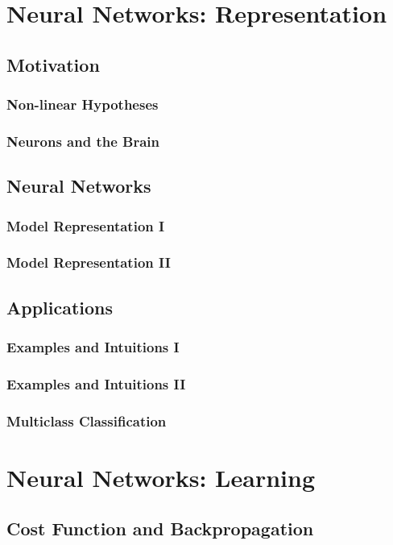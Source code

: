 \documentclass{article}
\begin{document}
\section{Neural Networks: Representation}
\subsection{Motivation}
\subsubsection{Non-linear Hypotheses}
\subsubsection{Neurons and the Brain}
\subsection{Neural Networks}
\subsubsection{Model Representation I}
\subsubsection{Model Representation II}
\subsection{Applications}
\subsubsection{Examples and Intuitions I}
\subsubsection{Examples and Intuitions II}
\subsubsection{Multiclass Classification}

\section{Neural Networks: Learning}
\subsection{Cost Function and Backpropagation}
\end{document}
